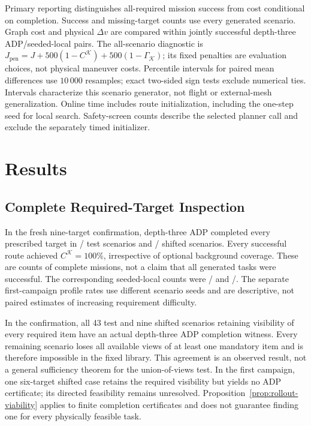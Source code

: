 Primary reporting distinguishes all-required mission success from cost conditional on completion. Success and missing-target counts use every generated scenario. Graph cost and physical $\Delta v$ are compared within jointly successful depth-three ADP/seeded-local pairs. The all-scenario diagnostic is $J_{\mathrm{pen}}=J+500(1-C^{\mathcal K})+500(1-\Gamma_{\mathcal K})$; its fixed penalties are evaluation choices, not physical maneuver costs. Percentile intervals for paired mean differences use $10\,000$ resamples; exact two-sided sign tests exclude numerical ties. Intervals characterize this scenario generator, not flight or external-mesh generalization. Online time includes route initialization, including the one-step seed for local search. Safety-screen counts describe the selected planner call and exclude the separately timed initializer.

\section{Results}
\label{sec:results}

\subsection{Complete Required-Target Inspection}

In the fresh nine-target confirmation, depth-three ADP completed every prescribed target in \RTTestSuccess/\RTTestN{} test scenarios and \RTOodSuccess/\RTOodN{} shifted scenarios. Every successful route achieved $C^{\mathcal K}=100\%$, irrespective of optional background coverage. These are counts of complete missions, not a claim that all generated tasks were successful. The corresponding seeded-local counts were \RTLocalTestSuccess/\RTTestN{} and \RTLocalOodSuccess/\RTOodN{}. The separate first-campaign profile rates use different scenario seeds and are descriptive, not paired estimates of increasing requirement difficulty.




In the confirmation, all 43 test and nine shifted scenarios retaining visibility of every required item have an actual depth-three ADP completion witness. Every remaining scenario loses all available views of at least one mandatory item and is therefore impossible in the fixed library. This agreement is an observed result, not a general sufficiency theorem for the union-of-views test. In the first campaign, one six-target shifted case retains the required visibility but yields no ADP certificate; its directed feasibility remains unresolved. Proposition~\ref{prop:rollout-viability} applies to finite completion certificates and does not guarantee finding one for every physically feasible task.

